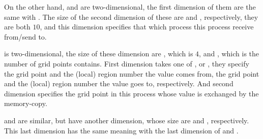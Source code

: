 On the other hand,  and  are
two-dimensional, the first dimension of them are the same with
.
%
The size of the second dimension of these are  and
, respectively, they are both $10$, and this dimension
specifies that which process this process receive from/send to.

 is two-dimensional, the size of these dimension are
, which is $4$, and , which is the
number of grid points  contains.
%
First dimension takes one of , 
 or , they specify
the grid point and the (local) region number the value comes from,
the grid point and the (local) region number the value goes to, respectively.
%
And second dimension specifies the grid point in this process whose value
is exchanged by the memory-copy.

 and  are similar, but have
another dimension, whose size are  and ,
respectively.
%
This last dimension has the same meaning with the last dimension of
 and .


